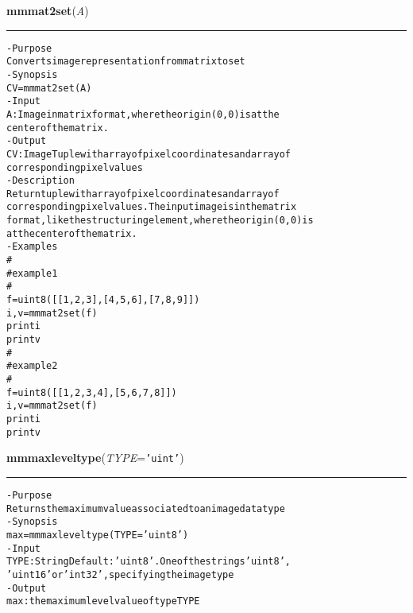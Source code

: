     \label{multireg:num_pymorph:mmmat2set}
    \vspace{0.5ex}

    \begin{boxedminipage}{\textwidth}

    \raggedright \textbf{mmmat2set}(\textit{A})

    \vspace{-1.5ex}

    \rule{\textwidth}{0.5\fboxrule}
\begin{alltt}
- Purpose
    Converts image representation from matrix to set
- Synopsis
    CV = mmmat2set(A)
- Input
    A: Image in matrix format, where the origin (0,0) is at the
       center of the matrix.
- Output
    CV: Image Tuple with array of pixel coordinates and array of
        corresponding pixel values
- Description
    Return tuple with array of pixel coordinates and array of
    corresponding pixel values. The input image is in the matrix
    format, like the structuring element, where the origin (0,0) is
    at the center of the matrix.
- Examples
    \#
    \#   example 1
    \#
    f=uint8([[1,2,3],[4,5,6],[7,8,9]])
    i,v=mmmat2set(f)
    print i
    print v
    \#
    \#   example 2
    \#
    f=uint8([[1,2,3,4],[5,6,7,8]])
    i,v=mmmat2set(f)
    print i
    print v\end{alltt}

    \vspace{1ex}

    \end{boxedminipage}

    \label{multireg:num_pymorph:mmmaxleveltype}
    \vspace{0.5ex}

    \begin{boxedminipage}{\textwidth}

    \raggedright \textbf{mmmaxleveltype}(\textit{TYPE}=\texttt{'\-u\-i\-n\-t\-'\-})

    \vspace{-1.5ex}

    \rule{\textwidth}{0.5\fboxrule}
\begin{alltt}
- Purpose
    Returns the maximum value associated to an image datatype
- Synopsis
    max = mmmaxleveltype(TYPE='uint8')
- Input
    TYPE: String Default: 'uint8'. One of the strings 'uint8',
          'uint16' or 'int32', specifying the image type
- Output
    max: the maximum level value of type TYPE\end{alltt}

    \vspace{1ex}

    \end{boxedminipage}

